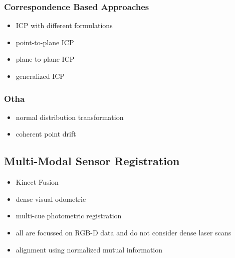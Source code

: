 \subsubsection{Correspondence Based Approaches}
\begin{itemize}
    \item ICP with different formulations
    \item point-to-plane ICP
    \item plane-to-plane ICP
    \item generalized ICP
\end{itemize}

\subsubsection{Otha}
\begin{itemize}
    \item normal distribution transformation
    \item coherent point drift
\end{itemize}

\subsection{Multi-Modal Sensor Registration}

\begin{itemize}
    \item Kinect Fusion\cite{newcombe_ismar2011}
    \item dense visual odometrie\cite{kerl_icra2013}
    \item multi-cue photometric registration\cite{corte_2017}
    \item all are focussed on RGB-D data and do not consider dense laser scans
    \item alignment using normalized mutual information
\end{itemize}

